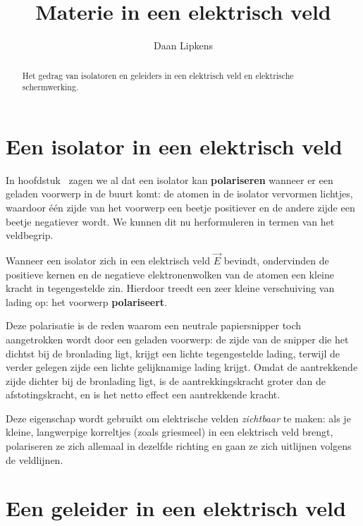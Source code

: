 \documentclass{ximera}
\title{Materie in een elektrisch veld}
\author{Daan Lipkens}
\begin{document}
\begin{abstract}
    Het gedrag van isolatoren en geleiders in een elektrisch veld en elektrische schermwerking.
\end{abstract}
\maketitle

\section{Een isolator in een elektrisch veld}

In hoofdstuk~ zagen we al dat een isolator kan \textbf{polariseren} wanneer er een geladen voorwerp in de buurt komt: de atomen in de isolator vervormen lichtjes, waardoor één zijde van het voorwerp een beetje positiever en de andere zijde een beetje negatiever wordt. We kunnen dit nu herformuleren in termen van het veldbegrip.

\begin{definition}[title={Polarisatie}]\nl
    Wanneer een isolator zich in een elektrisch veld $\vec{E}$ bevindt, ondervinden de positieve kernen en de negatieve elektronenwolken van de atomen een kleine kracht in tegengestelde zin. Hierdoor treedt een zeer kleine verschuiving van lading op: het voorwerp \textbf{polariseert}.
\end{definition}

Deze polarisatie is de reden waarom een neutrale papiersnipper toch aangetrokken wordt door een geladen voorwerp: de zijde van de snipper die het dichtst bij de bronlading ligt, krijgt een lichte tegengestelde lading, terwijl de verder gelegen zijde een lichte gelijknamige lading krijgt. Omdat de aantrekkende zijde dichter bij de bronlading ligt, is de aantrekkingskracht groter dan de afstotingskracht, en is het netto effect een aantrekkende kracht.

\begin{remark}
    Deze eigenschap wordt gebruikt om elektrische velden \textit{zichtbaar} te maken: als je kleine, langwerpige korreltjes (zoals griesmeel) in een elektrisch veld brengt, polariseren ze zich allemaal in dezelfde richting en gaan ze zich uitlijnen volgens de veldlijnen.
\end{remark}


\section{Een geleider in een elektrisch veld}
\end{document}
